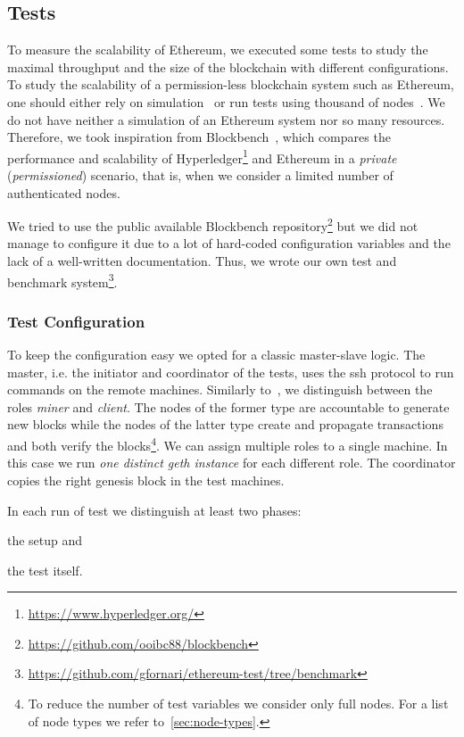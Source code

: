 \subsection{Tests}
\label{sec:tests}

To measure the scalability of Ethereum, we executed some tests to study the
maximal throughput and the size of the blockchain with different configurations.
To study the scalability of a permission-less blockchain system such as
Ethereum, one should either rely on
simulation~\cite{bib:securityAndScalabilityPoW} or run tests using thousand of
nodes~\cite{bib:securityAndScalabilityPoW, bib:algorand}. We do not have neither
a simulation of an Ethereum system nor so many resources. Therefore, we took
inspiration from Blockbench~\cite{blockbench}, which compares the performance
and scalability of Hyperledger\footnote{\url{https://www.hyperledger.org/}} and
Ethereum in a \emph{private} (\emph{permissioned}) scenario, that is, when we
consider a limited number of authenticated nodes.

We tried to use the public available Blockbench
repository\footnote{\url{https://github.com/ooibc88/blockbench}} but we did not
manage to configure it due to a lot of hard-coded configuration variables and
the lack of a well-written documentation. Thus, we wrote our own test and
benchmark
system\footnote{\url{https://github.com/gfornari/ethereum-test/tree/benchmark}}.


\subsubsection{Test Configuration}

To keep the configuration easy we opted for a classic master-slave logic. The
master, i.e. the initiator and coordinator of the tests, uses the ssh protocol
to run commands on the remote machines. Similarly to~\cite{blockbench}, we
distinguish between the roles \emph{miner} and \emph{client}. The nodes of the
former type are accountable to generate new blocks while the nodes of the latter
type create and propagate transactions and both verify the blocks\footnote{To
reduce the number of test variables we consider only full nodes. For a list of
node types we refer to~\autoref{sec:node-types}.}. We can assign multiple roles
to a single machine. In this case we run \emph{one distinct geth instance} for
each different role. The coordinator copies the right genesis block in the test
machines.

In each run of test we distinguish at least two phases:
\begin{enumerate*}
  \item the setup and
  \item the test itself.
\end{enumerate*}


